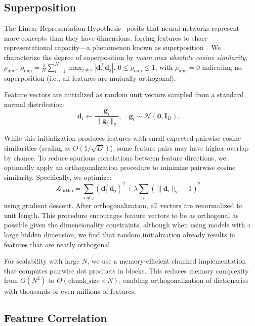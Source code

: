 \documentclass{article}
\theoremstyle{plain}
\theoremstyle{definition}
\theoremstyle{remark}
\begin{document}
\subsection{Superposition}
\label{sec:superposition}

The Linear Representation Hypothesis~\citep{park2024lrh} posits that neural networks represent more concepts than they have dimensions, forcing features to share representational capacity---a phenomenon known as superposition~\citep{elhage2022toy}. We characterize the degree of superposition by \emph{mean max absolute cosine similarity}, $\rho_{\text{mm}}$. $\rho_{\text{mm}} = \frac{1}{N} \sum_{i=1}^{N} \max_{j \neq i} |\mathbf{d}_i^\top \mathbf{d}_j|$. $0 \le \rho_{\text{mm}} \le 1$, with $\rho_{\text{mm}} = 0$ indicating no superposition (i.e., all features are mutually orthogonal).

Feature vectors are initialized as random unit vectors sampled from a standard normal distribution:
\begin{equation}
\mathbf{d}_i \leftarrow \frac{\mathbf{g}_i}{\|\mathbf{g}_i\|_2}, \quad \mathbf{g}_i \sim \mathcal{N}(\mathbf{0}, \mathbf{I}_D).
\end{equation}

While this initialization produces features with small expected pairwise cosine similarities (scaling as $O(1/\sqrt{D})$), some feature pairs may have higher overlap by chance. To reduce spurious correlations between feature directions, we optionally apply an orthogonalization procedure to minimize pairwise cosine similarity. Specifically, we optimize:
\begin{equation}
\mathcal{L}_\text{ortho} = \sum_{i \neq j} (\mathbf{d}_i^\top \mathbf{d}_j)^2 + \lambda \sum_i (\|\mathbf{d}_i\|_2 - 1)^2
\end{equation}
using gradient descent. After orthogonalization, all vectors are renormalized to unit length. This procedure encourages feature vectors to be as orthogonal as possible given the dimensionality constraints, although when using models with a large hidden dimension, we find that random initialization already results in features that are nearly orthogonal.

For scalability with large $N$, we use a memory-efficient chunked implementation that computes pairwise dot products in blocks. This reduces memory complexity from $O(N^2)$ to $O(\text{chunk\_size} \times N)$, enabling orthogonalization of dictionaries with thousands or even millions of features.

\subsection{Feature Correlation}
\label{sec:correlation}
\end{document}
